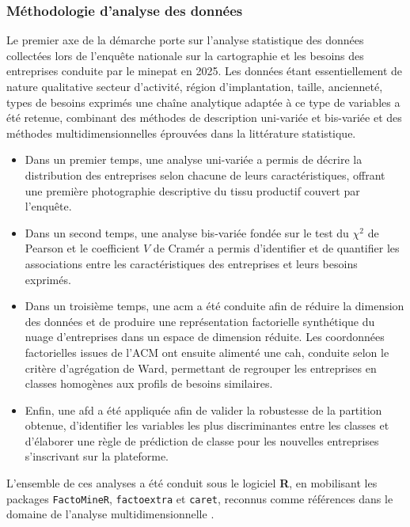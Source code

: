 \documentclass[12pt, a4paper, oneside]{report}
\begin{document}
	\subsubsection{Méthodologie d'analyse des données}
	Le premier axe de la démarche porte sur l'analyse statistique
	des données collectées lors de l'enquête nationale sur la
	cartographie et les besoins des entreprises conduite par le
	\gls{minepat} en 2025. Les données étant essentiellement de
	nature qualitative secteur d'activité, région d'implantation,
	taille, ancienneté, types de besoins exprimés une chaîne
	analytique adaptée à ce type de variables a été retenue,
	combinant des méthodes de description uni-variée et bis-variée et
	des méthodes multidimensionnelles éprouvées dans la littérature
	statistique.
	\begin{itemize}
		\item Dans un premier temps, une analyse uni-variée a
		permis de décrire la distribution des entreprises selon chacune
		de leurs caractéristiques, offrant une première photographie
		descriptive du tissu productif couvert par l'enquête.
		\item Dans un
		second temps, une analyse bis-variée fondée sur le test du
		$\chi^2$ de Pearson et le coefficient $V$ de Cramér a permis
		d'identifier et de quantifier les associations entre les
		caractéristiques des entreprises et leurs besoins exprimés.
		\item Dans un troisième temps,
		une \gls{acm} a été
		conduite afin de réduire la dimension des données et de
		produire une représentation factorielle synthétique du nuage
		d'entreprises dans un espace de dimension réduite. Les
		coordonnées factorielles issues de l'ACM ont ensuite alimenté
		une \gls{cah},
		conduite selon le critère d'agrégation de Ward, permettant de
		regrouper les entreprises en classes homogènes aux profils de
		besoins similaires.
		\item Enfin, une \gls{afd} a été appliquée afin de valider la robustesse de
		la partition obtenue, d'identifier les variables les plus
		discriminantes entre les classes et d'élaborer une règle de
		prédiction de classe pour les nouvelles entreprises s'inscrivant
		sur la plateforme.
	\end{itemize}
	L'ensemble de ces analyses a été conduit sous
	le logiciel \textbf{R}, en mobilisant les packages
	\texttt{FactoMineR}, \texttt{factoextra} et \texttt{caret},
	reconnus comme références dans le domaine de l'analyse
	multidimensionnelle \citep{husson_le_pages_2009}.
	
\end{document}
